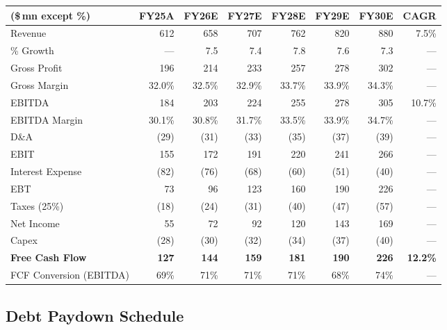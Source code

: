 \noindent
\begin{tabularx}{\linewidth}{lrrrrrrr}
  \toprule
  \rowcolor{NavyDark}
  \color{white}\textbf{(\$\,mn except \%)} &
  \color{white}\textbf{FY25A} &
  \color{white}\textbf{FY26E} &
  \color{white}\textbf{FY27E} &
  \color{white}\textbf{FY28E} &
  \color{white}\textbf{FY29E} &
  \color{white}\textbf{FY30E} &
  \color{white}\textbf{CAGR} \\
  \midrule
  Revenue                    & 612 & 658 & 707 & 762 & 820 & 880 & 7.5\% \\
  \rowcolor{IceBlue}
  \% Growth                  & --- & 7.5 & 7.4 & 7.8 & 7.6 & 7.3 & ---   \\
  Gross Profit               & 196 & 214 & 233 & 257 & 278 & 302 & ---   \\
  Gross Margin               & 32.0\% & 32.5\% & 32.9\% & 33.7\% & 33.9\% & 34.3\% & --- \\
  \rowcolor{IceBlue}
  EBITDA                     & 184 & 203 & 224 & 255 & 278 & 305 & 10.7\% \\
  EBITDA Margin              & 30.1\% & 30.8\% & 31.7\% & 33.5\% & 33.9\% & 34.7\% & --- \\
  D\&A                       & (29) & (31) & (33) & (35) & (37) & (39) & --- \\
  \rowcolor{IceBlue}
  EBIT                       & 155 & 172 & 191 & 220 & 241 & 266 & --- \\
  Interest Expense           & (82) & (76) & (68) & (60) & (51) & (40) & --- \\
  EBT                        & 73  & 96  & 123 & 160 & 190 & 226 & --- \\
  \rowcolor{IceBlue}
  Taxes (25\%)               & (18) & (24) & (31) & (40) & (47) & (57) & --- \\
  Net Income                 & 55  & 72  & 92  & 120 & 143 & 169 & --- \\
  \midrule
  Capex                      & (28) & (30) & (32) & (34) & (37) & (40) & --- \\
  \rowcolor{IceBlue}
  \textbf{Free Cash Flow}    & \textbf{127} & \textbf{144} & \textbf{159} &
    \textbf{181} & \textbf{190} & \textbf{226} & \textbf{12.2\%} \\
  FCF Conversion (EBITDA)    & 69\% & 71\% & 71\% & 71\% & 68\% & 74\% & --- \\
  \bottomrule
\end{tabularx}

\vspace{10pt}
\subsection{Debt Paydown Schedule}

